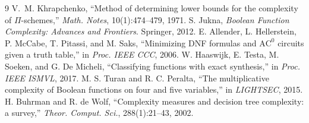 \documentclass[10pt]{article}
\begin{document}
\begingroup
\footnotesize
\setlength{\parskip}{0pt}
\begin{thebibliography}{9}
\setlength{\itemsep}{0pt}
V.~M. Khrapchenko, ``Method of determining lower bounds for the complexity of
$\Pi$-schemes,'' \emph{Math. Notes}, 10(1):474--479, 1971.
S. Jukna, \emph{Boolean Function Complexity: Advances and Frontiers}.
Springer, 2012.
E. Allender, L. Hellerstein, P. McCabe, T. Pitassi, and M. Saks,
``Minimizing DNF formulas and $\mathrm{AC}^0$ circuits given a truth table,''
in \emph{Proc. IEEE CCC}, 2006.
W. Haaswijk, E. Testa, M. Soeken, and G. De Micheli,
``Classifying functions with exact synthesis,'' in \emph{Proc. IEEE ISMVL},
2017.
M. S. Turan and R. C. Peralta, ``The multiplicative complexity of Boolean
functions on four and five variables,'' in \emph{LIGHTSEC}, 2015.
H. Buhrman and R. de Wolf, ``Complexity measures and decision tree
complexity: a survey,'' \emph{Theor. Comput. Sci.}, 288(1):21--43, 2002.
\end{thebibliography}
\endgroup
\end{document}
